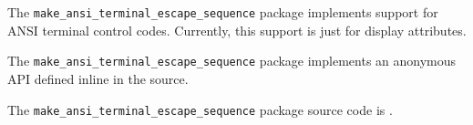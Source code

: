 
The {\tt make\_ansi\_terminal\_escape\_sequence} package implements support for ANSI terminal control codes.  Currently, this support 
is just for display attributes.

The {\tt make\_ansi\_terminal\_escape\_sequence} package implements an anonymous API defined inline in the source.

The {\tt make\_ansi\_terminal\_escape\_sequence} package source code is .



